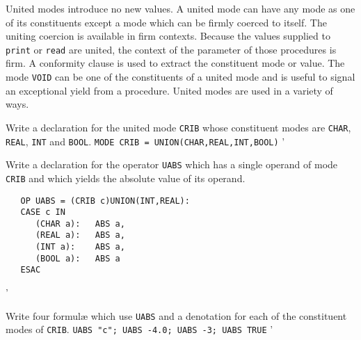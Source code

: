 United modes introduce no new values. A united mode can have any mode
as one of its constituents except a mode which can be firmly coerced to
itself. The uniting coercion is available in firm contexts. Because the
values supplied to \verb|print| or \verb|read| are united, the context
of the parameter of those procedures is firm. A conformity clause is
used to extract the constituent mode or value. The mode \verb|VOID| can
be one of the constituents of a united mode and is useful to signal an
exceptional yield from a procedure. United modes are used in a variety
of ways.

\begin{exercise}
\item Write a declaration for the united mode \verb|CRIB| whose constituent
modes are \verb|CHAR|, \verb|REAL|, \verb|INT| and \verb|BOOL|.
\ans \verb|MODE CRIB = UNION(CHAR,REAL,INT,BOOL)|
'
\item Write a declaration for the operator \verb|UABS| which has a single
operand of mode \verb|CRIB| and which yields the absolute value of its
operand. \ans \ %
\begin{verbatim}
   OP UABS = (CRIB c)UNION(INT,REAL):
   CASE c IN
      (CHAR a):   ABS a,
      (REAL a):   ABS a,
      (INT a):    ABS a,
      (BOOL a):   ABS a
   ESAC
\end{verbatim}
'
\item Write four formul{\ae} which use \verb|UABS| and a denotation for each
of the constituent modes of \verb|CRIB|.
\ans \verb|UABS "c"; UABS -4.0; UABS -3; UABS TRUE|
'
\end{exercise}
